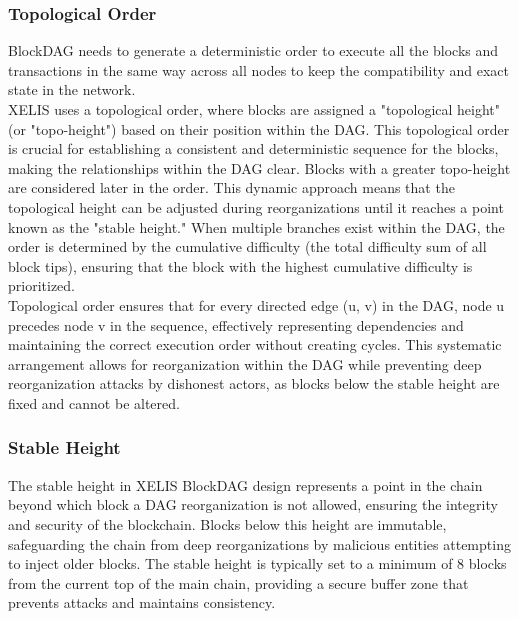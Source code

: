 \documentclass[12pt,a4paper,twocolumn]{article}
\begin{document}
\subsubsection{Topological Order}

BlockDAG needs to generate a deterministic order to execute all the blocks and transactions in the same way across all nodes to keep the compatibility and exact state in the network. \\

XELIS uses a topological order, where blocks are assigned a "topological height" (or "topo-height") based on their position within the DAG. This topological order is crucial for establishing a consistent and deterministic sequence for the blocks, making the relationships within the DAG clear. Blocks with a greater topo-height are considered later in the order. This dynamic approach means that the topological height can be adjusted during reorganizations until it reaches a point known as the "stable height." When multiple branches exist within the DAG, the order is determined by the cumulative difficulty (the total difficulty sum of all block tips), ensuring that the block with the highest cumulative difficulty is prioritized.\\

Topological order ensures that for every directed edge (u, v) in the DAG, node u precedes node v in the sequence, effectively representing dependencies and maintaining the correct execution order without creating cycles. This systematic arrangement allows for reorganization within the DAG while preventing deep reorganization attacks by dishonest actors, as blocks below the stable height are fixed and cannot be altered.\\

\subsubsection{Stable Height}

The stable height in XELIS BlockDAG design represents a point in the chain beyond which block a DAG reorganization is not allowed, ensuring the integrity and security of the blockchain. Blocks below this height are immutable, safeguarding the chain from deep reorganizations by malicious entities attempting to inject older blocks. The stable height is typically set to a minimum of 8 blocks from the current top of the main chain, providing a secure buffer zone that prevents attacks and maintains consistency.
\end{document}
